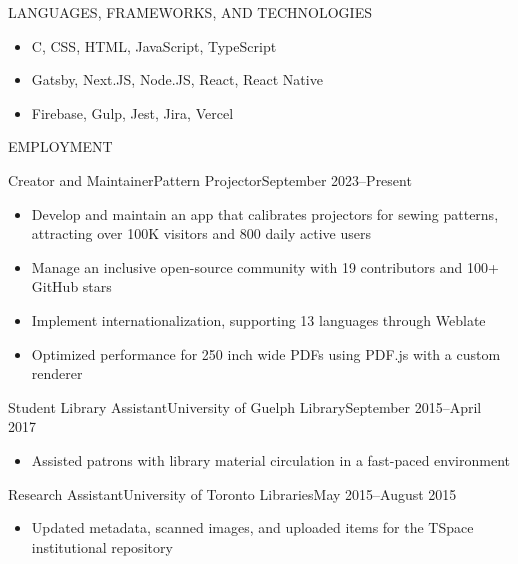 \documentclass[]{mcdowellcv}
\begin{document}
\makeheader

\begin{cvsection}{LANGUAGES, FRAMEWORKS, AND TECHNOLOGIES}
  \begin{cvsubsection}{}{}{}
    \begin{itemize}
      \item C, CSS, HTML, JavaScript, TypeScript
      \item Gatsby, Next.JS, Node.JS, React, React Native
      \item Firebase, Gulp, Jest, Jira, Vercel
    \end{itemize}
  \end{cvsubsection}
\end{cvsection}

\begin{cvsection}{EMPLOYMENT}
  \begin{cvsubsection}{Creator and Maintainer}{Pattern Projector}{September 2023--Present}
    \begin{itemize}
      \item Develop and maintain an app that calibrates projectors for sewing patterns,
            attracting over 100K visitors and 800 daily active users
      \item Manage an inclusive open-source community with 19 contributors and 100+ GitHub
            stars
      \item Implement internationalization, supporting 13 languages through Weblate
      \item Optimized performance for 250 inch wide PDFs using PDF.js with a custom
            renderer
    \end{itemize}
  \end{cvsubsection}

  \begin{cvsubsection}{Student Library Assistant}{University of Guelph Library}{September 2015--April 2017}
    \begin{itemize}
      \item Assisted patrons with library material circulation in a fast-paced environment
    \end{itemize}
  \end{cvsubsection}

  \begin{cvsubsection}{Research Assistant}{University of Toronto Libraries}{May 2015--August 2015}
    \begin{itemize}
      \item Updated metadata, scanned images, and uploaded items for the TSpace
            institutional repository
    \end{itemize}
  \end{cvsubsection}


\end{cvsection}
\end{document}
